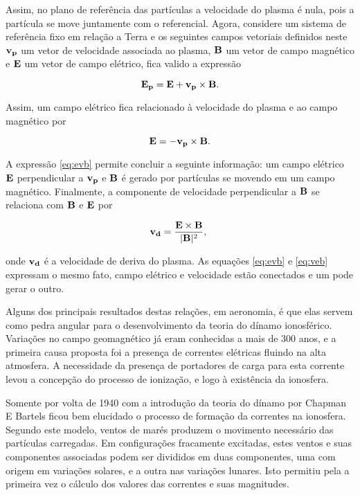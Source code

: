 Assim, no plano de referência das partículas a velocidade do plasma é nula, pois a partícula se move juntamente com o referencial. Agora, considere um sistema de referência fixo em relação a Terra e os seguintes campos vetoriais definidos neste ${\bf v_p}$ um vetor de velocidade associada ao plasma, ${\bf B}$ um vetor de campo magnético e ${\bf E}$ um vetor de campo elétrico, fica valido a expressão

\begin{equation}
{\bf E_p}= {\bf E}+{\bf v_p}\times{\bf B}\mbox{.}
\end{equation}

Assim, um campo elétrico fica relacionado à velocidade do plasma e ao campo magnético por

\begin{equation}\label{eq:evb}
{\bf E}=-{\bf v_p}\times{\bf B}\mbox{.}
\end{equation}

A expressão \eqref{eq:evb} permite concluir a seguinte informação: um campo elétrico ${\bf E}$ perpendicular a ${\bf v_p}$ e ${\bf B}$ é gerado por partículas se movendo em um campo magnético. Finalmente, a componente de velocidade perpendicular a ${\bf B}$ se relaciona com ${\bf B}$ e ${\bf E}$ por

\begin{equation}\label{eq:veb}
{\bf v_d}=\frac{{\bf E}\times{\bf B}}{|{\bf B}|^2}\mbox{,}~
\end{equation}

onde ${\bf v_d}$ é a velocidade de deriva do plasma. As equações \eqref{eq:evb} e \eqref{eq:veb} expressam o mesmo fato, campo elétrico e velocidade estão conectados e um pode gerar o outro.

Alguns dos principais resultados destas relações, em aeronomia, é que elas servem como pedra angular para o desenvolvimento da teoria do dínamo ionosférico. Variações no campo geomagnético já eram conhecidas a mais de 300 anos, e a primeira causa proposta foi a presença de correntes elétricas fluindo na alta atmosfera. A necessidade da presença de portadores de carga para esta corrente levou a concepção do processo de ionização, e logo à existência da ionosfera.

Somente por volta de 1940 com a introdução da teoria do dínamo por Chapman E Bartels ficou bem elucidado o processo de formação da correntes na ionosfera. Segundo este modelo, ventos de marés produzem o movimento necessário das partículas carregadas. Em configurações fracamente excitadas, estes ventos e suas componentes associadas podem ser divididos em duas componentes, uma com origem em variações solares, e a outra nas variações lunares. Isto permitiu pela a primeira vez o cálculo dos valores das correntes e suas magnitudes.

